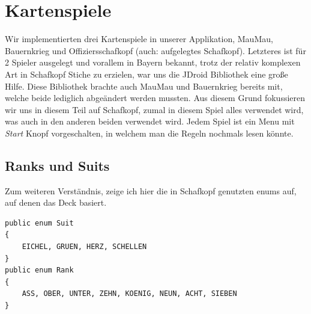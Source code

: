 \section{Kartenspiele}
\sectionauthor{\philipp}

Wir implementierten drei Kartenspiele in unserer Applikation, MauMau,
Bauernkrieg und Offiziersschafkopf (auch: aufgelegtes Schafkopf). Letzteres ist
für 2 Spieler ausgelegt und vorallem in Bayern bekannt, trotz der relativ
komplexen Art in Schafkopf Stiche zu erzielen, war uns die JDroid Bibliothek
eine große Hilfe. Diese Bibliothek brachte auch MauMau und Bauernkrieg bereits
mit, welche beide lediglich abgeändert werden mussten.  Aus diesem Grund
fokussieren wir uns in diesem Teil auf Schafkopf, zumal in diesem Spiel alles
verwendet wird, was auch in den anderen beiden verwendet wird.  Jedem Spiel ist
ein Menu mit \emph{Start} Knopf vorgeschalten, in welchem man die Regeln
nochmals lesen könnte.

\subsection{Ranks und Suits}

Zum weiteren Verständnis, zeige ich hier die in Schafkopf genutzten enums auf,
auf denen das Deck basiert.

\begin{lstlisting}[caption={Enums für Kartenwertigkeiten},captionpos=b]
public enum Suit
{
    EICHEL, GRUEN, HERZ, SCHELLEN
}
public enum Rank
{
    ASS, OBER, UNTER, ZEHN, KOENIG, NEUN, ACHT, SIEBEN
}
\end{lstlisting}

